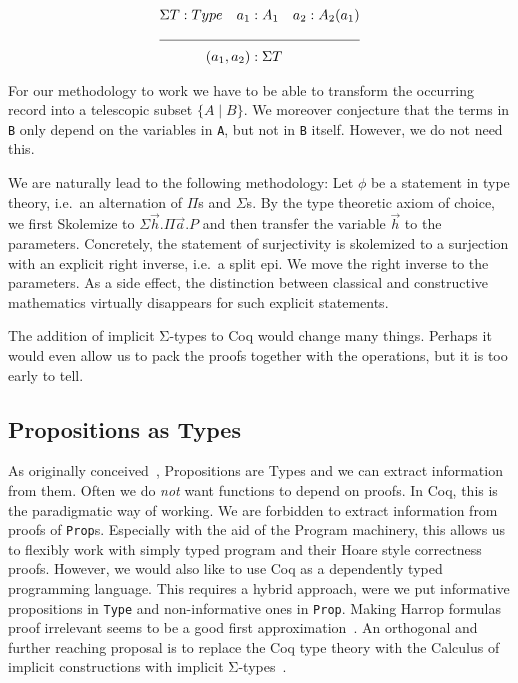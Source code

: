 \documentclass[a4paper,10pt,runningheads]{llncs}
\begin{document}
\begin{align*}
 \Sigma T:Type\quad a_1 &:A_1 \quad a_2 : A_2(a_1)\\
\cline{1-3}
(a_1,a_2) &: \Sigma T
\end{align*}

For our methodology to work we have to be able to transform the occurring record into a telescopic
subset $\{ A \mid  B\}$. We moreover conjecture that the terms in \lstinline|B| only depend on the
variables in \lstinline|A|, but not in \lstinline|B| itself. However, we do not need this.

We are naturally lead to the following methodology: Let $\phi$ be a statement in type
theory, i.e.\ an alternation of $\Pi$s and $\Sigma$s. By the type theoretic axiom of choice, we first Skolemize to $\Sigma \overrightarrow{h}. \Pi \overrightarrow{a}. P$ and then transfer the variable $\overrightarrow{h}$ to the parameters. Concretely, the statement of surjectivity is skolemized to a surjection with an explicit right inverse, i.e.\ a split epi. We move the right inverse to the parameters. As a side effect, the distinction between classical and constructive mathematics virtually disappears for such explicit statements.

The addition of implicit Σ-types to Coq would change many things. Perhaps it would even allow us
to pack the proofs together with the operations, but it is too early to tell.

\subsection{Propositions as Types}
As originally conceived~\cite{ITT,CMCP}, Propositions are Types and we can extract information from
them. Often we do \emph{not} want functions to depend on proofs. In Coq, this is the paradigmatic way of working. We are forbidden to extract information from proofs of \lstinline|Prop|s. Especially with the aid of the Program machinery, this allows us to flexibly work with simply typed program and their Hoare style correctness proofs. However, we would also like to use Coq as a dependently typed programming language. This requires a hybrid approach, were we put informative propositions in \lstinline|Type| and non-informative ones in \lstinline|Prop|. Making Harrop formulas proof irrelevant seems to be a good first approximation~\cite{lcf:spi:03}. An orthogonal and further reaching proposal is to replace the Coq type theory with the Calculus of implicit constructions with implicit
Σ-types~\cite{miquel2001implicit,barras2008implicit,Bernardo}. 
\end{document}
